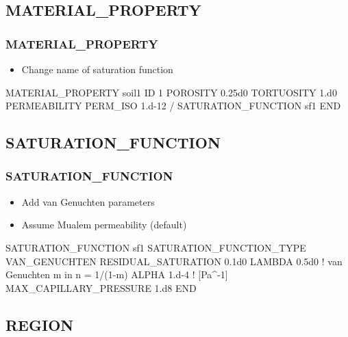 \documentclass{beamer}
\newcommand\bluecomment[1]{{{\color{blue} #1}}}
\newcommand\magentacomment[1]{{{\color{magenta} #1}}}
\begin{document}
\subsection{MATERIAL\_PROPERTY}

\begin{frame}[fragile]\frametitle{MATERIAL\_PROPERTY}

\begin{itemize}
\item Change name of saturation function
\end{itemize}

\begin{semiverbatim}
MATERIAL_PROPERTY soil1
  ID 1
  POROSITY 0.25d0
  TORTUOSITY 1.d0
  PERMEABILITY
    PERM_ISO 1.d-12
  /
  SATURATION_FUNCTION \magentacomment{sf1}
END
\end{semiverbatim}

\end{frame}

\subsection{SATURATION\_FUNCTION}

\begin{frame}[fragile]\frametitle{SATURATION\_FUNCTION}

\begin{itemize}
\item Add van Genuchten parameters
\item Assume Mualem permeability (default)
\end{itemize}

\begin{semiverbatim}
SATURATION_FUNCTION \magentacomment{sf1
  SATURATION_FUNCTION_TYPE VAN_GENUCHTEN
  RESIDUAL_SATURATION 0.1d0
  LAMBDA 0.5d0     \bluecomment{! van Genuchten m in n = 1/(1-m)}
  ALPHA 1.d-4      \bluecomment{! [Pa^-1]}
  MAX_CAPILLARY_PRESSURE 1.d8}
END
\end{semiverbatim}

\end{frame}

\subsection{REGION}
\end{document}
